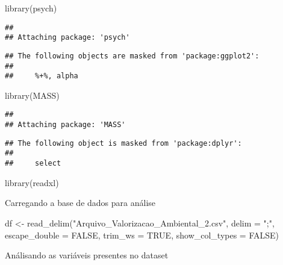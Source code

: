 \documentclass[
]{article}
\newenvironment{Shaded}{\begin{snugshade}}{\end{snugshade}}
\newcommand{\AttributeTok}[1]{\textcolor[rgb]{0.77,0.63,0.00}{#1}}
\newcommand{\ConstantTok}[1]{\textcolor[rgb]{0.00,0.00,0.00}{#1}}
\newcommand{\FunctionTok}[1]{\textcolor[rgb]{0.00,0.00,0.00}{#1}}
\newcommand{\NormalTok}[1]{#1}
\newcommand{\OtherTok}[1]{\textcolor[rgb]{0.56,0.35,0.01}{#1}}
\newcommand{\StringTok}[1]{\textcolor[rgb]{0.31,0.60,0.02}{#1}}
\begin{document}
\begin{Shaded}
\begin{Highlighting}[]
\FunctionTok{library}\NormalTok{(psych)}
\end{Highlighting}
\end{Shaded}

\begin{verbatim}
## 
## Attaching package: 'psych'
\end{verbatim}

\begin{verbatim}
## The following objects are masked from 'package:ggplot2':
## 
##     %+%, alpha
\end{verbatim}

\begin{Shaded}
\begin{Highlighting}[]
\FunctionTok{library}\NormalTok{(MASS)}
\end{Highlighting}
\end{Shaded}

\begin{verbatim}
## 
## Attaching package: 'MASS'
\end{verbatim}

\begin{verbatim}
## The following object is masked from 'package:dplyr':
## 
##     select
\end{verbatim}

\begin{Shaded}
\begin{Highlighting}[]
\FunctionTok{library}\NormalTok{(readxl)}
\end{Highlighting}
\end{Shaded}

Carregando a base de dados para análise

\begin{Shaded}
\begin{Highlighting}[]
\NormalTok{df }\OtherTok{\textless{}{-}} \FunctionTok{read\_delim}\NormalTok{(}\StringTok{"Arquivo\_Valorizacao\_Ambiental\_2.csv"}\NormalTok{, }
    \AttributeTok{delim =} \StringTok{";"}\NormalTok{, }\AttributeTok{escape\_double =} \ConstantTok{FALSE}\NormalTok{, }\AttributeTok{trim\_ws =} \ConstantTok{TRUE}\NormalTok{, }\AttributeTok{show\_col\_types =} \ConstantTok{FALSE}\NormalTok{)}
\end{Highlighting}
\end{Shaded}

Análisando as variáveis presentes no dataset
\end{document}
